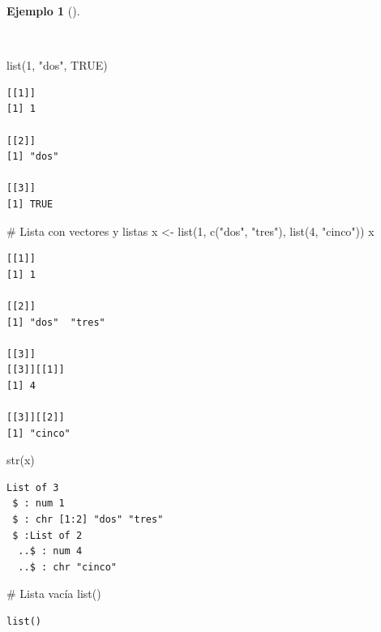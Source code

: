 \documentclass[
  a4paper,
]{scrreport}
\newenvironment{Shaded}{\begin{snugshade}}{\end{snugshade}}
\newcommand{\CommentTok}[1]{\textcolor[rgb]{0.37,0.37,0.37}{#1}}
\newcommand{\ConstantTok}[1]{\textcolor[rgb]{0.56,0.35,0.01}{#1}}
\newcommand{\DecValTok}[1]{\textcolor[rgb]{0.68,0.00,0.00}{#1}}
\newcommand{\FunctionTok}[1]{\textcolor[rgb]{0.28,0.35,0.67}{#1}}
\newcommand{\NormalTok}[1]{\textcolor[rgb]{0.00,0.23,0.31}{#1}}
\newcommand{\OtherTok}[1]{\textcolor[rgb]{0.00,0.23,0.31}{#1}}
\newcommand{\StringTok}[1]{\textcolor[rgb]{0.13,0.47,0.30}{#1}}
\theoremstyle{definition}
\theoremstyle{definition}
\newtheorem{example}{Ejemplo}[chapter]
\theoremstyle{remark}
\begin{document}
\begin{example}[]\protect\hypertarget{exm-creacion-listas}{}\label{exm-creacion-listas}

~

\begin{Shaded}
\begin{Highlighting}[]
\FunctionTok{list}\NormalTok{(}\DecValTok{1}\NormalTok{, }\StringTok{"dos"}\NormalTok{, }\ConstantTok{TRUE}\NormalTok{)}
\end{Highlighting}
\end{Shaded}

\begin{verbatim}
[[1]]
[1] 1

[[2]]
[1] "dos"

[[3]]
[1] TRUE
\end{verbatim}

\begin{Shaded}
\begin{Highlighting}[]
\CommentTok{\# Lista con vectores y listas}
\NormalTok{x }\OtherTok{\textless{}{-}} \FunctionTok{list}\NormalTok{(}\DecValTok{1}\NormalTok{, }\FunctionTok{c}\NormalTok{(}\StringTok{"dos"}\NormalTok{, }\StringTok{"tres"}\NormalTok{), }\FunctionTok{list}\NormalTok{(}\DecValTok{4}\NormalTok{, }\StringTok{"cinco"}\NormalTok{))}
\NormalTok{x}
\end{Highlighting}
\end{Shaded}

\begin{verbatim}
[[1]]
[1] 1

[[2]]
[1] "dos"  "tres"

[[3]]
[[3]][[1]]
[1] 4

[[3]][[2]]
[1] "cinco"
\end{verbatim}

\begin{Shaded}
\begin{Highlighting}[]
\FunctionTok{str}\NormalTok{(x)}
\end{Highlighting}
\end{Shaded}

\begin{verbatim}
List of 3
 $ : num 1
 $ : chr [1:2] "dos" "tres"
 $ :List of 2
  ..$ : num 4
  ..$ : chr "cinco"
\end{verbatim}

\begin{Shaded}
\begin{Highlighting}[]
\CommentTok{\# Lista vacía}
\FunctionTok{list}\NormalTok{()}
\end{Highlighting}
\end{Shaded}

\begin{verbatim}
list()
\end{verbatim}

\end{example}
\end{document}

